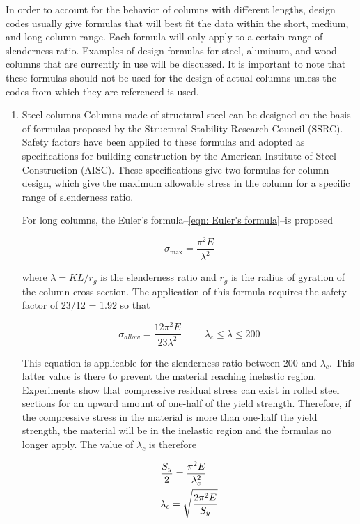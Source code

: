 \documentclass[a4paper,openany,nobib]{tufte-book}
\begin{document}
{{In order to account for the behavior of columns with different lengths,
design codes usually give formulas that will best fit the data within
the short, medium, and long column range. Each formula will only apply
to a certain range of slenderness ratio. Examples of design formulas for
steel, aluminum, and wood columns that are currently in use will be
discussed. It is important to note that these formulas should not be
used for the design of actual columns unless the codes from which they
are referenced is used.

\begin{enumerate}
\item Steel columns
\label{steel-columns}
Columns made of structural steel can be designed on the basis of
formulas proposed by the Structural Stability Research Council (SSRC).
Safety factors have been applied to these formulas and adopted as
specifications for building construction by the American Institute of
Steel Construction (AISC). These specifications give two formulas for
column design, which give the maximum allowable stress in the column for
a specific range of slenderness ratio.

For long columns, the Euler's
formula--\ref{eqn: Euler's formula}--is proposed

$$\sigma_{\max} = \frac{\pi^2E}{\lambda^2}$$

where \(\lambda = KL/r_g\) is the slenderness ratio and \(r_g\) is the
radius of gyration of the column cross section. The application of this
formula requires the safety factor of 23/12 = 1.92 so that

$$\sigma_{allow} = \frac{12\pi^2E}{23\lambda^2} \hspace{1cm} \lambda_c \leqslant \lambda \leqslant 200$$

This equation is applicable for the slenderness ratio between 200 and
\(\lambda_c\). This latter value is there to prevent the material reaching
inelastic region. Experiments show that compressive residual stress can
exist in rolled steel sections for an upward amount of one-half of the
yield strength. Therefore, if the compressive stress in the material is
more than one-half the yield strength, the material will be in the
inelastic region and the formulas no longer apply. The value of
\(\lambda_c\) is therefore

$$\begin{gathered}
  \frac{S_y}{2} = \frac{\pi ^2E}{\lambda_c^2} \hfill \\
  \lambda_c = \sqrt {\frac{2\pi^2E}{S_y}}  \hfill \end{gathered}$$


\end{enumerate}}}
\end{document}
